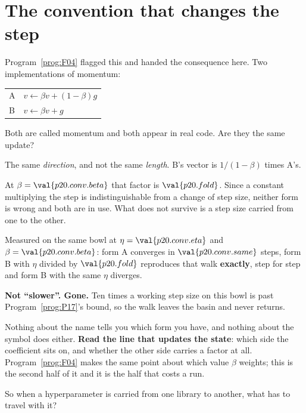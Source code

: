\section{The convention that changes the step}
\label{sec:P20-convention}

\begin{fr}
Program~\ref{prog:F04} flagged this and handed the consequence here. Two
implementations of momentum:

\begin{center}
\begin{tabular}{ll}
\toprule
A & $v \leftarrow \beta v + (1-\beta) g$ \\
B & $v \leftarrow \beta v + g$ \\
\bottomrule
\end{tabular}
\end{center}

Both are called momentum and both appear in real code. Are they the same
update?
\dotline
\nextframe
\end{fr}

\begin{fr}
\begin{ansblock}
The same \emph{direction}, and not the same \emph{length}. B's vector is
$1/(1-\beta)$ times A's.
\end{ansblock}

At $\beta = \val{p20.conv.beta}$ that factor is $\val{p20.fold}$. Since a
constant multiplying the step is indistinguishable from a change of step size,
neither form is wrong and both are in use. What does not survive is a step size
carried from one to the other.

Measured on the same bowl at $\eta = \val{p20.conv.eta}$ and
$\beta = \val{p20.conv.beta}$: form A converges in $\val{p20.conv.same}$ steps,
form B with $\eta$ divided by $\val{p20.fold}$ reproduces that walk
\textbf{exactly}, step for step \dash{} and form B with the same $\eta$
diverges.
\end{fr}

\begin{fr}
\begin{warning}
\textbf{Not \enquote{slower}. Gone.} Ten times a working step size on this
bowl is past Program~\ref{prog:P17}'s bound, so the walk leaves the basin and
never returns.

Nothing about the name tells you which form you have, and nothing about the
symbol does either. \textbf{Read the line that updates the state}: which side
the coefficient sits on, and whether the other side carries a factor at all.
Program~\ref{prog:F04} makes the same point about which value $\beta$ weights;
this is the second half of it and it is the half that costs a run.
\end{warning}

So when a hyperparameter is carried from one library to another, what has to
travel with it?
\nextframe
\end{fr}

